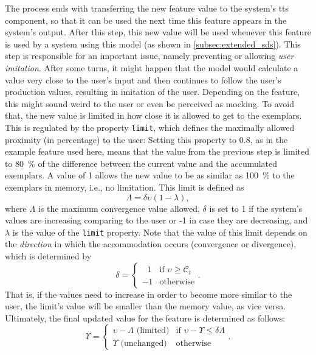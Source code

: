 The process ends with transferring the new feature value to the system's \ac{tts} component, so that it can be used the next time this feature appears in the system's output.
After this step, this new value will be used whenever this feature is used by a system using this model (as shown in \cref{subsec:extended_sds}).
This step is responsible for an important issue, namely preventing or allowing \emph{user imitation}.
After some turns, it might happen that the model would calculate a value very close to the user's input and then continues to follow the user's production values, resulting in imitation of the user.
Depending on the feature, this might sound weird to the user or even be perceived as mocking.
To avoid that, the new value is limited in how close it is allowed to get to the exemplars.
This is regulated by the property \texttt{limit}, which defines the maximally allowed proximity (in percentage) to the user:
Setting this property to 0.8, as in the example feature used here, means that the value from the previous step is limited to \SI{80}{\percent} of the difference between the current value and the accumulated exemplars.
A value of 1 allows the new value to be as similar as \SI{100}{\percent} to the exemplars in memory, i.e., no limitation.
This limit is defined as
%
\begin{equation}
	\label{eq:conv_limit}
	\Lambda = \delta \upsilon \left(1 - \lambda \right),
\end{equation}
\noindent
%
where $\Lambda$ is the maximum convergence value allowed, $\delta$ is set to 1 if the system's values are increasing comparing to the user or -1 in case they are decreasing, and $\lambda$ is the value of the \texttt{limit} property.
Note that the value of this limit depends on the \emph{direction} in which the accommodation occurs (convergence or divergence), which is determined by
%
\begin{equation}
	\label{eq:direction}
	\delta = 		
	\begin{cases}
		\ \ \ 1 & \text{if } \upsilon \geq \mathcal{C}_t\\
		-1 & \text{otherwise}
	\end{cases}.
\end{equation}
\noindent
%
That is, if the values need to increase in order to become more similar to the user, the limit's value will be smaller than the memory value, as vice versa.
Ultimately, the final updated value for the feature is determined as follows:
%
\begin{equation}
	\label{eq:new_value}
	\Upsilon = 		
	\begin{cases}
		\upsilon - \Lambda \text{ (limited)}	& \text{if }\upsilon - \Upsilon \leq \delta\Lambda\\
		\Upsilon \text{ (unchanged)} 			& \text{otherwise}
	\end{cases}.
\end{equation}
